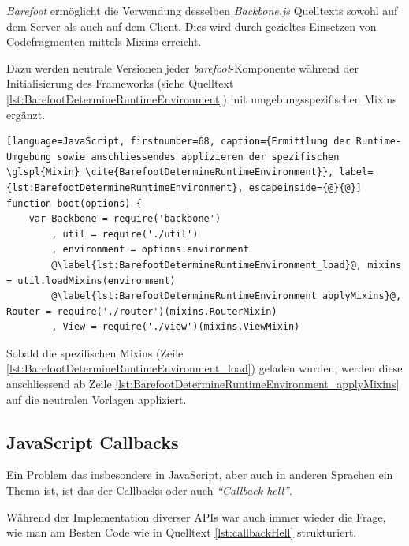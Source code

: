 \emph{Barefoot} \cite{Barefoot} ermöglicht die Verwendung desselben \emph{Backbone.js} Quelltexts sowohl auf dem Server als auch auf dem Client. Dies wird durch gezieltes Einsetzen von Codefragmenten mittels \gls{Mixin}s erreicht.

Dazu werden neutrale Versionen jeder \emph{barefoot}-Komponente während der Initialisierung des Frameworks (siehe Quelltext \ref{lst:BarefootDetermineRuntimeEnvironment}) mit umgebungsspezifischen Mixins ergänzt.

\begin{lstlisting}[language=JavaScript, firstnumber=68, caption={Ermittlung der Runtime-Umgebung sowie anschliessendes applizieren der spezifischen \glspl{Mixin} \cite{BarefootDetermineRuntimeEnvironment}}, label={lst:BarefootDetermineRuntimeEnvironment}, escapeinside={@}{@}]
function boot(options) {
	var Backbone = require('backbone')
		, util = require('./util')
		, environment = options.environment
		@\label{lst:BarefootDetermineRuntimeEnvironment_load}@, mixins = util.loadMixins(environment)
		@\label{lst:BarefootDetermineRuntimeEnvironment_applyMixins}@, Router = require('./router')(mixins.RouterMixin)
		, View = require('./view')(mixins.ViewMixin)
\end{lstlisting}

Sobald die spezifischen \gls{Mixin}s (Zeile \ref{lst:BarefootDetermineRuntimeEnvironment_load}) geladen wurden, werden diese anschliessend ab Zeile \ref{lst:BarefootDetermineRuntimeEnvironment_applyMixins} auf die neutralen Vorlagen appliziert.

\subsection{JavaScript Callbacks}
Ein Problem das insbesondere in JavaScript, aber auch in anderen Sprachen ein Thema ist, ist das der Callbacks oder auch \emph{``Callback hell''}.

Während der Implementation diverser APIs war auch immer wieder die Frage, wie man am Besten Code wie in Quelltext \ref{lst:callbackHell} strukturiert.

